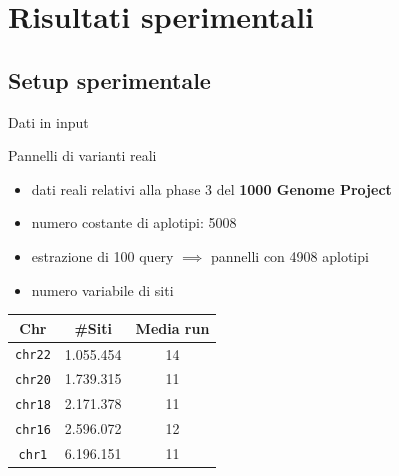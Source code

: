 \documentclass[]{beamer}
\def\PBWT{\mbox{\rm {\sf PBWT}}}
\def\RLPBWT{\mbox{\rm {\sf RLPBWT}}}
\def\Cplusplus{C\raisebox{0.5ex}{\tiny\textbf{++}}}
\begin{document}
\section{Risultati sperimentali}
\subsection{Setup sperimentale}
\begin{frame}{Dati in input}
  \begin{block}{Pannelli di varianti reali}
    \begin{itemize}
      \item dati reali relativi alla phase 3 del \textbf{1000 Genome Project}
      \item numero costante di aplotipi: 5008
      \item estrazione di 100 query $\implies$ pannelli con 4908 aplotipi
      \item numero variabile di siti
    \end{itemize}
  \end{block}
  \begin{table}[H]
    \centering
    \begin{tabular}{c|c|c}
      \textbf{Chr} & \textbf{\#Siti} & \textbf{Media run} \\ 
      \hline
      \texttt{chr22} & 1.055.454 & 14\\
      \texttt{chr20} & 1.739.315 & 11\\
      \texttt{chr18} & 2.171.378 & 11\\
      \texttt{chr16} & 2.596.072 & 12\\
      \texttt{chr1} & 6.196.151 & 11\\
    \end{tabular}
  \end{table}
\end{frame}
\end{document}
